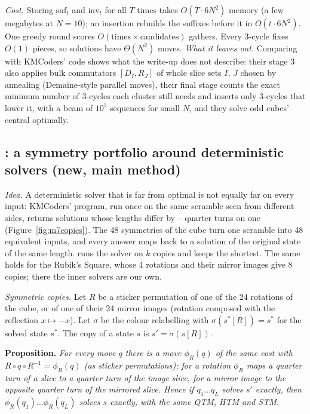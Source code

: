 \emph{Cost.} Storing $\mathrm{suf}_t$ and $\mathrm{inv}_t$ for all $T$ times takes $O(T\cdot6N^2)$ memory (a few megabytes at
$N=10$); an insertion rebuilds the suffixes before it in $O(t\cdot6N^2)$. One greedy round scores $O(\text{times}\times
\text{candidates})$ gathers. Every 3-cycle fixes $O(1)$ pieces, so solutions have $\Theta(N^2)$ moves.
\emph{What it leaves out.} Comparing with KMCoders' code shows what the write-up does not describe: their stage 3 also applies
bulk commutators $[D_I,R_J]$ of whole slice sets $I$, $J$ chosen by annealing (Demaine-style parallel moves), their final stage
counts the exact minimum number of 3-cycles each cluster still needs and inserts only 3-cycles that lower it, with a beam of
$10^5$ sequences for small $N$, and they solve odd cubes' central  optimally.

\subsection{\Mseven: a symmetry portfolio around deterministic solvers (new, main method)}
\label{sec:m7}

\emph{Idea.} A deterministic solver that is far from optimal is not equally far on every input: KMCoders' program, run once
on the same scramble seen from different sides, returns solutions whose lengths differ by \MsevenSpreadMinFour{}--\MsevenSpreadMaxFour{} quarter turns on one  (Figure~\ref{fig:m7copies}).
The 48 symmetries of the cube turn one scramble into 48 equivalent inputs, and every answer maps back to a solution of the
original state of the same length. \Mseven runs the solver on $k$ copies and keeps the shortest. The same holds for the Rubik's
Square, whose 4 rotations and their mirror images give 8 copies; there the inner solvers are our own.

\emph{Symmetric copies.} Let $R$ be a sticker permutation of one of the 24 rotations of the cube, or of one of their 24
mirror images (rotation composed with the reflection $x\mapsto-x$). Let $\sigma$ be the colour relabelling with
$\sigma(s^\ast[R])=s^\ast$ for the solved state $s^\ast$. The copy of a state $s$ is $s'=\sigma(s[R])$.

\textbf{Proposition.} \emph{For every move $q$ there is a move $\phi_R(q)$ of the same cost with
$R\circ q\circ R^{-1}=\phi_R(q)$ (as sticker permutations); for a rotation $\phi_R$ maps a quarter turn of a slice to a quarter
turn of the image slice, for a mirror image to the opposite quarter turn of the mirrored slice. Hence if $q_1\dots q_L$ solves
$s'$ exactly, then $\phi_R(q_1)\dots\phi_R(q_L)$ solves $s$ exactly, with the same QTM, HTM and STM.}

